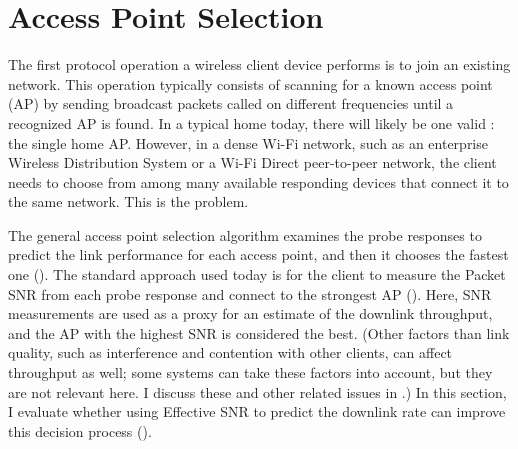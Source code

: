 \section{Access Point Selection}\label{sec:esnr_apsel}
The first protocol operation a wireless client device performs is to join an existing network. This operation typically consists of scanning for a known access point (AP) by sending broadcast packets called  on different frequencies until a recognized AP is found. In a typical home today, there will likely be one valid : the single home AP. However, in a dense Wi-Fi network, such as an enterprise Wireless Distribution System or a Wi-Fi Direct peer-to-peer network, the client needs to choose from among many available responding devices that connect it to the same network. This is the  problem.

The general access point selection algorithm examines the probe responses to predict the link performance for each access point, and then it chooses the fastest one (). The standard approach used today is for the client to measure the Packet SNR from each probe response and connect to the strongest AP (). Here, SNR measurements are used as a proxy for an estimate of the downlink throughput, and the AP with the highest SNR is considered the best. (Other factors than link quality, such as interference and contention with other clients, can affect throughput as well; some systems can take these factors into account, but they are not relevant here. I discuss these and other related issues in .)
In this section, I evaluate whether using Effective SNR to predict the downlink rate can improve this decision process ().


